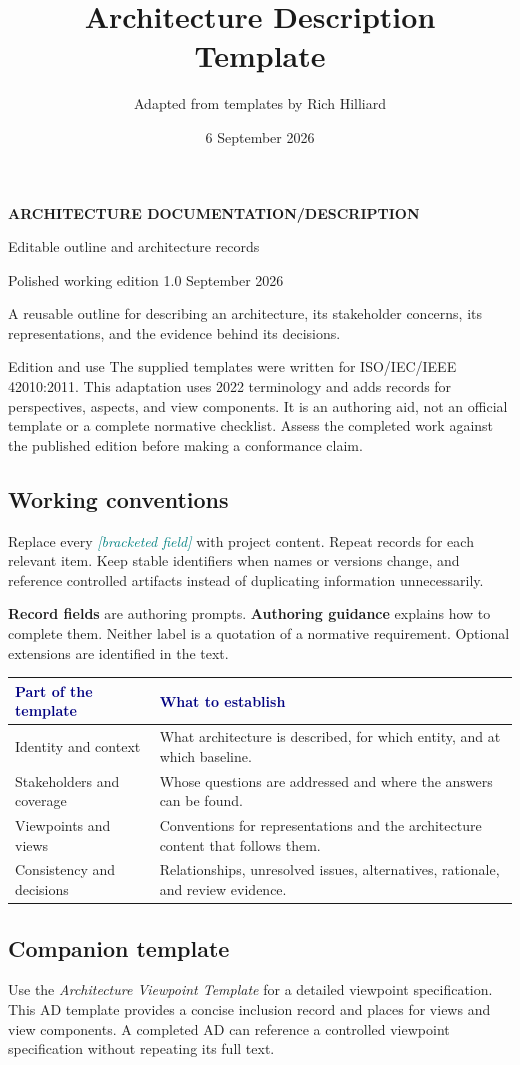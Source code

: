 \documentclass[11pt,letterpaper]{article}
\title{Architecture Description\\Template}
\author{Adapted from templates by Rich Hilliard}
\date{6 September 2026}
\makeatletter
\newcommand{\FillIn}[1]{\textcolor{Teal}{\sffamily\itshape[#1]}}
\newcommand{\TableHead}[1]{\textcolor{Navy}{\sffamily\bfseries#1}}
\newcommand{\Lead}[1]{\textcolor{Muted}{#1}\par\vspace{3pt}}
\newcommand{\TemplateTitle}[3]{%
  {\sffamily\small\bfseries\color{Teal}ARCHITECTURE DOCUMENTATION\enspace /\enspace #1\par}
  \vspace{14pt}
  {\sffamily\bfseries\fontsize{29}{33}\selectfont\color{Navy}#2\par}
  \vspace{10pt}
  {\sffamily\large\color{Muted}#3\par}
  \vspace{11pt}
  {\sffamily\small\color{Muted}Polished working edition 1.0\enspace\textbullet\enspace 6 September 2026\par}
  \vspace{13pt}{\color{Teal}\hrule height 1.2pt}\vspace{9pt}}
\newcommand{\EditionNote}{%
  The supplied templates were written for ISO/IEC/IEEE 42010:2011.
  This adaptation uses 2022 terminology and adds records for perspectives,
  aspects, and view components. It is an authoring aid, not an official template
  or a complete normative checklist. Assess the completed work against the
  published edition before making a conformance claim.}
\renewcommand{\maketitle}{\TemplateTitle{DESCRIPTION}{\@title}{Editable outline and architecture records}}
\makeatother
\begin{document}
\maketitle
\Lead{A reusable outline for describing an architecture, its stakeholder concerns,
its representations, and the evidence behind its decisions.}

\begin{TemplateNote}{Edition and use}
\EditionNote
\end{TemplateNote}

\subsection{Working conventions}
Replace every \FillIn{bracketed field} with project content. Repeat records for
each relevant item. Keep stable identifiers when names or versions change, and
reference controlled artifacts instead of duplicating information unnecessarily.

\textbf{Record fields} are authoring prompts. \textbf{Authoring guidance}
explains how to complete them. Neither label is a quotation of a normative
requirement. Optional extensions are identified in the text.

{\small
\begin{tabularx}{\linewidth}{@{}L{1.7in}Y@{}}
\toprule
\TableHead{Part of the template} & \TableHead{What to establish}\\
\midrule
Identity and context & What architecture is described, for which entity, and at which baseline.\\
Stakeholders and coverage & Whose questions are addressed and where the answers can be found.\\
Viewpoints and views & Conventions for representations and the architecture content that follows them.\\
Consistency and decisions & Relationships, unresolved issues, alternatives, rationale, and review evidence.\\
\bottomrule
\end{tabularx}}

\subsection{Companion template}
Use the \emph{Architecture Viewpoint Template} for a detailed viewpoint
specification. This AD template provides a concise inclusion record and places
for views and view components. A completed AD can reference a controlled
viewpoint specification without repeating its full text.
\end{document}
